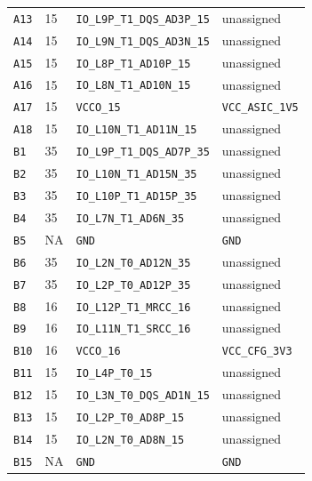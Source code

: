 \documentclass[11pt,a4paper]{article}
\begin{document}
\begin{longtable}{@{}P{13mm}P{13mm}P{78mm}P{62mm}@{}}
\nolinkurl{A13} & 15 & \nolinkurl{IO_L9P_T1_DQS_AD3P_15} & \textcolor{muted}{unassigned} \\
\nolinkurl{A14} & 15 & \nolinkurl{IO_L9N_T1_DQS_AD3N_15} & \textcolor{muted}{unassigned} \\
\nolinkurl{A15} & 15 & \nolinkurl{IO_L8P_T1_AD10P_15} & \textcolor{muted}{unassigned} \\
\nolinkurl{A16} & 15 & \nolinkurl{IO_L8N_T1_AD10N_15} & \textcolor{muted}{unassigned} \\
\nolinkurl{A17} & 15 & \nolinkurl{VCCO_15} & \nolinkurl{VCC_ASIC_1V5} \\
\nolinkurl{A18} & 15 & \nolinkurl{IO_L10N_T1_AD11N_15} & \textcolor{muted}{unassigned} \\
\nolinkurl{B1} & 35 & \nolinkurl{IO_L9P_T1_DQS_AD7P_35} & \textcolor{muted}{unassigned} \\
\nolinkurl{B2} & 35 & \nolinkurl{IO_L10N_T1_AD15N_35} & \textcolor{muted}{unassigned} \\
\nolinkurl{B3} & 35 & \nolinkurl{IO_L10P_T1_AD15P_35} & \textcolor{muted}{unassigned} \\
\nolinkurl{B4} & 35 & \nolinkurl{IO_L7N_T1_AD6N_35} & \textcolor{muted}{unassigned} \\
\nolinkurl{B5} & NA & \nolinkurl{GND} & \nolinkurl{GND} \\
\nolinkurl{B6} & 35 & \nolinkurl{IO_L2N_T0_AD12N_35} & \textcolor{muted}{unassigned} \\
\nolinkurl{B7} & 35 & \nolinkurl{IO_L2P_T0_AD12P_35} & \textcolor{muted}{unassigned} \\
\nolinkurl{B8} & 16 & \nolinkurl{IO_L12P_T1_MRCC_16} & \textcolor{muted}{unassigned} \\
\nolinkurl{B9} & 16 & \nolinkurl{IO_L11N_T1_SRCC_16} & \textcolor{muted}{unassigned} \\
\nolinkurl{B10} & 16 & \nolinkurl{VCCO_16} & \nolinkurl{VCC_CFG_3V3} \\
\nolinkurl{B11} & 15 & \nolinkurl{IO_L4P_T0_15} & \textcolor{muted}{unassigned} \\
\nolinkurl{B12} & 15 & \nolinkurl{IO_L3N_T0_DQS_AD1N_15} & \textcolor{muted}{unassigned} \\
\nolinkurl{B13} & 15 & \nolinkurl{IO_L2P_T0_AD8P_15} & \textcolor{muted}{unassigned} \\
\nolinkurl{B14} & 15 & \nolinkurl{IO_L2N_T0_AD8N_15} & \textcolor{muted}{unassigned} \\
\nolinkurl{B15} & NA & \nolinkurl{GND} & \nolinkurl{GND} \\

\end{longtable}
\end{document}
